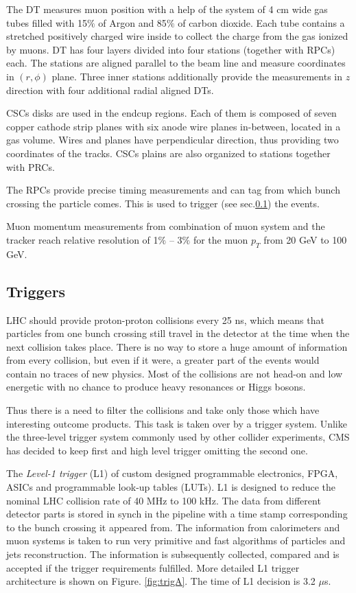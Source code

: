 The DT measures muon position with a help of the system of 4 cm wide gas tubes filled with 15$\%$ of Argon and 85$\%$ of carbon dioxide.
Each tube contains a stretched positively charged wire inside to collect the charge from the gas ionized by muons. DT has four layers
divided into four stations (together with RPCs) each. The stations are aligned parallel to the beam line and measure coordinates in $(r,\phi)$
plane. Three inner stations additionally provide the measurements in $z$ direction with four additional radial aligned DTs.

CSCs disks are used in the endcup regions. Each of them is composed of seven copper cathode strip planes with six anode wire planes in-between, located in 
a gas volume. Wires and planes have perpendicular direction, thus providing two coordinates of the tracks. CSCs plains are also organized 
to stations together with PRCs.

The RPCs provide precise timing measurements and can tag from which bunch crossing the particle comes. This is used to trigger (see sec.\ref{sec:trig})
the events.

Muon momentum measurements from combination of muon system and the tracker reach relative resolution of 1$\%$ -- 3$\%$ for the muon $p_{T}$ from
20 GeV to 100 GeV.

\subsection{Triggers}\label{sec:trig}

LHC should provide proton-proton collisions every 25 ns, which means that particles from one bunch crossing still travel in the detector at 
the time when the next collision takes place. There is no way to store a huge amount of information from every collision, but even if it were,
a greater part of the events would contain no traces of new physics. Most of the collisions are not head-on and low energetic with no chance
to produce heavy resonances or Higgs bosons.

Thus there is a need to filter the collisions and take only those which have interesting outcome products. This task is taken over by a trigger
system\cite{CMSatLHC}. Unlike the three-level trigger system commonly used by other collider experiments, CMS has decided to keep first and high
level trigger omitting the second one.

The \textit{Level-1 trigger} (L1) of custom designed programmable electronics, FPGA, ASICs and programmable look-up tables (LUTs). L1 is designed
to reduce the nominal LHC collision rate of 40 MHz to 100 kHz. The data from different detector parts is stored in synch in the pipeline with a 
time stamp corresponding to the bunch crossing it appeared from. The information from calorimeters and muon systems is taken to run very primitive
and fast algorithms of particles and jets reconstruction. The information is subsequently collected, compared and is accepted if the trigger
requirements fulfilled. More detailed L1 trigger architecture is shown on Figure. \ref{fig:trigA}. The time of L1 decision is 3.2 $\mu$s. 

